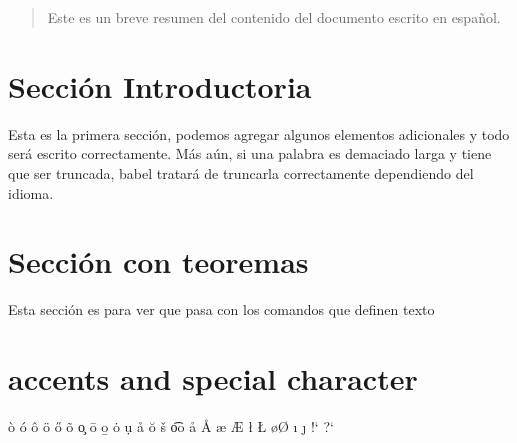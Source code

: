 \documentclass{article}
\begin{document}
\tableofcontents

\begin{abstract}
Este es un breve resumen del contenido del documento escrito en español.
\end{abstract}

\section{Sección Introductoria}
Esta es la primera sección, podemos agregar algunos elementos adicionales y todo será escrito correctamente. Más aún, si una palabra es demaciado larga y tiene que ser truncada, babel tratará de truncarla correctamente dependiendo del idioma.

\section{Sección con teoremas}
Esta sección es para ver que pasa con los comandos que definen texto

\section{accents and special character}

\`{o}
\'{o}
\^{o}
\"{o}
\H{o}
\~{o}
\c{o}
\={o}
\b{o}
\.{o}
\d{u}
\r{a}
\u{o}
\v{s}
\t{oo}
\aa
\AA
\ae
\AE
\l
\L
\o\O
\i
\j
!`
?`
\end{document}
